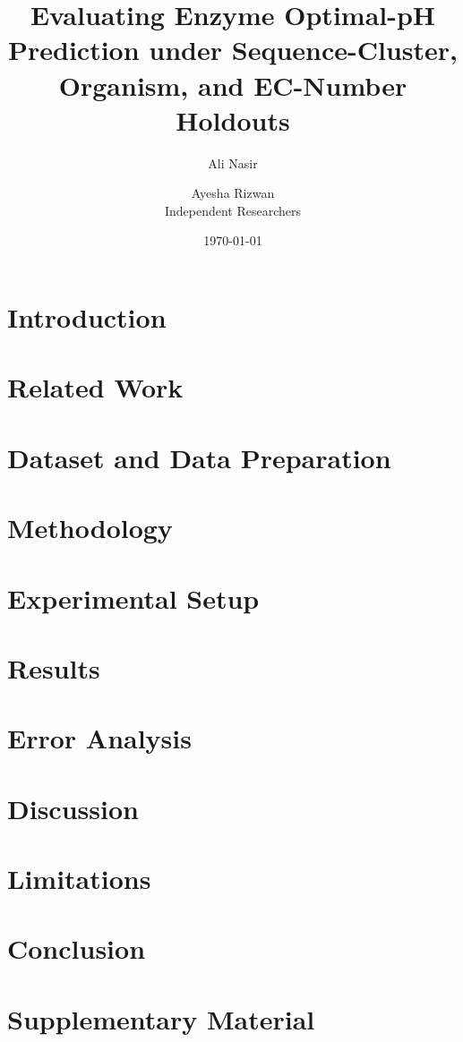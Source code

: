 \documentclass[11pt]{article}
\title{Evaluating Enzyme Optimal-pH Prediction under Sequence-Cluster, Organism, and EC-Number Holdouts}
\author{Ali Nasir \and Ayesha Rizwan\\Independent Researchers}
\date{\today}
\begin{document}
\maketitle



\section{Introduction}
\label{sec:introduction}


\section{Related Work}
\label{sec:related-work}


\section{Dataset and Data Preparation}
\label{sec:dataset}


\section{Methodology}
\label{sec:methodology}


\section{Experimental Setup}
\label{sec:experiments}


\section{Results}
\label{sec:results}


\section{Error Analysis}
\label{sec:error-analysis}


\section{Discussion}
\label{sec:discussion}


\section{Limitations}
\label{sec:limitations}


\section{Conclusion}
\label{sec:conclusion}





\appendix
\section{Supplementary Material}
\label{sec:supplementary}

\end{document}
